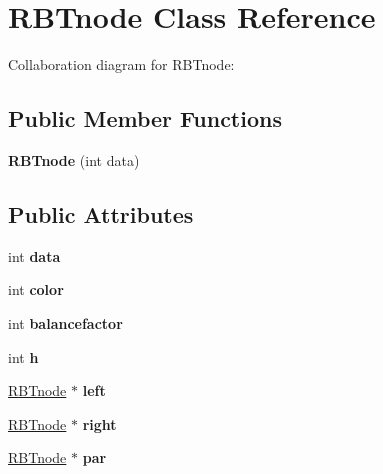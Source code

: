 \hypertarget{classRBTnode}{}\section{R\+B\+Tnode Class Reference}
\label{classRBTnode}


Collaboration diagram for R\+B\+Tnode\+:
\subsection*{Public Member Functions}
\begin{DoxyCompactItemize}
\item 
\mbox{\label{classRBTnode_a944c595a43a8ae574d80048935ffdca1}} 
{\bfseries R\+B\+Tnode} (int data)
\end{DoxyCompactItemize}
\subsection*{Public Attributes}
\begin{DoxyCompactItemize}
\item 
\mbox{\label{classRBTnode_aa935b7a6203662a311c2013c72b08326}} 
int {\bfseries data}
\item 
\mbox{\label{classRBTnode_a5c7764e517c6de5cb6f7d0face185e41}} 
int {\bfseries color}
\item 
\mbox{\label{classRBTnode_a6025f27c8d5799f0aaa758a90460e546}} 
int {\bfseries balancefactor}
\item 
\mbox{\label{classRBTnode_a165102d536657dba50c76222bea3a983}} 
int {\bfseries h}
\item 
\mbox{\label{classRBTnode_a50668587b4af9665b8d57d81012fb3ae}} 
\hyperlink{classRBTnode}{R\+B\+Tnode} $\ast$ {\bfseries left}
\item 
\mbox{\label{classRBTnode_af9249c58f13631f3047f7159b64df92c}} 
\hyperlink{classRBTnode}{R\+B\+Tnode} $\ast$ {\bfseries right}
\item 
\mbox{\label{classRBTnode_ad7d45f5d4971dacc74efc28917ff29b0}} 
\hyperlink{classRBTnode}{R\+B\+Tnode} $\ast$ {\bfseries par}
\end{DoxyCompactItemize}


